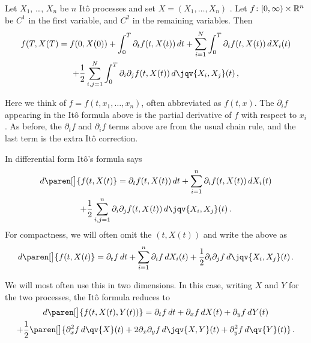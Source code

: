 \begin{theorem}
  Let $X_1$, \dots, $X_n$ be $n$ It\^o processes and set $X = (X_1, \dots, X_n)$ .
  Let $f\colon [0, \infty)\times \mathbb{R}^n$ be $C^1$ in the first variable, and $C^2$ in the remaining variables.
  Then
  \begin{multline*}
    f(T, X(T)
      = f(0, X(0))
	+ \int_0^T \partial_t f(t, X(t)) \, dt 
	+ \sum_{i=1}^{N} \int_0^T \partial_i f(t, X(t)) \, dX_i(t)
    \\
	+ \frac{1}{2} \sum_{i,j=1}^N \int_0^T \partial_i \partial_j f(t, X(t)) \, d\jqv{X_i, X_j}(t)\,,
  \end{multline*}
\end{theorem}
\begin{remark}
  Here we think of $f = f(t, x_1, \dots, x_n)$, often abbreviated as $f(t, x)$.
  The $\partial_i f$ appearing in the It\^o formula above is the partial derivative of $f$ with respect to $x_i$.
  As before, the $\partial_t f$ and $\partial_i f$ terms above are from the usual chain rule, and the last term is the extra It\^o correction.
\end{remark}
\begin{remark}
  In differential form It\^o's formula says
  \begin{multline*}
    d\paren[\big]{ f(t, X(t)}
      = \partial_t f(t, X(t)) \, dt 
	+ \sum_{i=1}^{n} \partial_i f(t, X(t)) \, dX_i(t)
    \\
	+ \frac{1}{2} \sum_{i,j = 1}^n
	  \partial_i \partial_j f(t, X(t)) \, d\jqv{X_i, X_j}(t)\,.
  \end{multline*}
  For compactness, we will often omit the $(t, X(t))$ and write the above as
  \begin{equation*}
    d\paren[\big]{ f(t, X(t)}
      = \partial_t f \, dt 
	+ \sum_{i=1}^{n} \partial_i f \, dX_i(t)
	+ \frac{1}{2} \partial_i \partial_j f \, d\jqv{X_i, X_j}(t)\,.
  \end{equation*}
\end{remark}
\begin{remark}
  We will most often use this in two dimensions.
  In this case, writing $X$ and $Y$ for the two processes, the It\^o formula reduces to
  \begin{multline*}
    d\paren[\big]{f(t, X(t), Y(t))}
      = \partial_t f \, dt
	+ \partial_x f \, dX(t)
	+ \partial_y f \, dY(t)
    \\
	+ \frac{1}{2} \paren[\big]{
	    \partial_x^2 f \, d\qv{X}(t)
	    + 2 \partial_x \partial_y f \, d\jqv{X,Y}(t)
	    + \partial_y^2 f \, d\qv{Y}(t)
	}\,.
  \end{multline*}
\end{remark}

